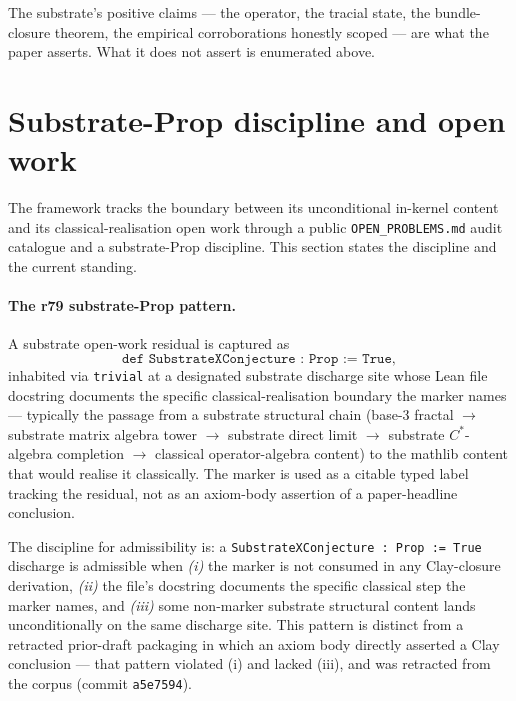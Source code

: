 \documentclass[11pt,a4paper]{amsart}
\theoremstyle{plain}
\theoremstyle{definition}
\begin{document}
The substrate's positive claims --- the operator, the tracial state, the bundle-closure theorem, the empirical corroborations honestly scoped --- are what the paper asserts. What it does not assert is enumerated above.

\section{Substrate-Prop discipline and open work}\label{sec:standing}

The framework tracks the boundary between its unconditional in-kernel content and its classical-realisation open work through a public \texttt{OPEN\_PROBLEMS.md} audit catalogue and a substrate-Prop discipline. This section states the discipline and the current standing.

\paragraph{The r79 substrate-Prop pattern.} A substrate open-work residual is captured as
\[
\texttt{def SubstrateXConjecture : Prop := True},
\]
inhabited via \texttt{trivial} at a designated substrate discharge site whose Lean file docstring documents the specific classical-realisation boundary the marker names --- typically the passage from a substrate structural chain (base-3 fractal $\to$ substrate matrix algebra tower $\to$ substrate direct limit $\to$ substrate $C^*$-algebra completion $\to$ classical operator-algebra content) to the mathlib content that would realise it classically. The marker is used as a citable typed label tracking the residual, not as an axiom-body assertion of a paper-headline conclusion.

The discipline for admissibility is: a \texttt{SubstrateXConjecture : Prop := True} discharge is admissible when \emph{(i)} the marker is not consumed in any Clay-closure derivation, \emph{(ii)} the file's docstring documents the specific classical step the marker names, and \emph{(iii)} some non-marker substrate structural content lands unconditionally on the same discharge site. This pattern is distinct from a retracted prior-draft packaging in which an axiom body directly asserted a Clay conclusion --- that pattern violated (i) and lacked (iii), and was retracted from the corpus (commit \texttt{a5e7594}).
\end{document}
